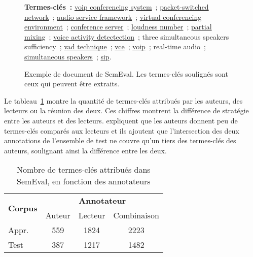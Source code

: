 \begin{figure}[!h]
{{          \textbf{Termes-clés~:} \underline{voip conferencing system}~;
          \underline{packet-switched network}~; \underline{audio service
          framework}~; \underline{virtual conferencing environment}~;
          \underline{conference server}~; \underline{loudness number}~;
          \underline{partial mixing}~; \underline{voice activity detectection}~;
          three simultaneous speakers sufficiency~; \underline{vad technique}~;
          \underline{vce}~; \underline{voip}~; real-time audio~;
          \underline{simultaneous speakers}~; \underline{sip}.
        }
      }
      \caption[Exemple de document de SemEval]{
        Exemple de document de SemEval. Les termes-clés soulignés sont ceux qui
        peuvent être extraits.
        \label{fig:example_semeval}
      }
    \end{figure}

    Le tableau~\ref{tab:semeval_annotators} montre la quantité de termes-clés
    attribués par les auteurs, des lecteurs ou la réunion des deux. Ces chiffres
    montrent la différence de stratégie entre les auteurs et des lecteurs.
     expliquent que les auteurs donnent peu de
    termes-clés comparés aux lecteurs et ils ajoutent que l'intersection des
    deux annotations de l'ensemble de test ne couvre qu'un tiers des termes-clés
    des auteurs, soulignant ainsi la différence entre les deux.

    \begin{table}[!h]
      \centering
      \begin{tabular}{l|ccc}
        \toprule
        \multirow{2}{*}{\textbf{Corpus}} & \multicolumn{3}{c}{\textbf{Annotateur}}\\
        \cline{2-4}
        & Auteur & Lecteur & Combinaison\\
        \hline
        \hfill{}Appr. & 559 & 1824 & 2223\\
        \hfill{}Test & 387 & 1217 & 1482\\
        \bottomrule
      \end{tabular}

      \caption{Nombre de termes-clés attribués dans SemEval, en fonction des
               annotateurs
               \label{tab:semeval_annotators}}
    \end{table}


